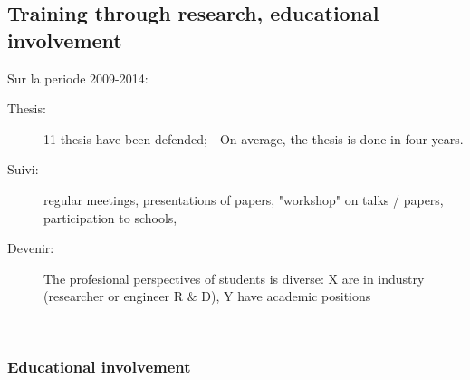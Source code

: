 




\subsection{Training through research, educational involvement} %
\label{sub:hadas_training_through_research_educational_involvment}



Sur la periode 2009-2014: 
\begin{description}

\item[Thesis:]  11 thesis have been defended;  - On average, the thesis is done in four years. 


\item[Suivi:] regular meetings, presentations of papers, "workshop" on talks / papers, participation to schools,

\item[Devenir:]  
The profesional perspectives of  students is diverse: X are in industry (researcher or engineer R  $\&$ D),  Y have academic positions

\ \\


\end{description}

\subsubsection*{Educational involvement} %

